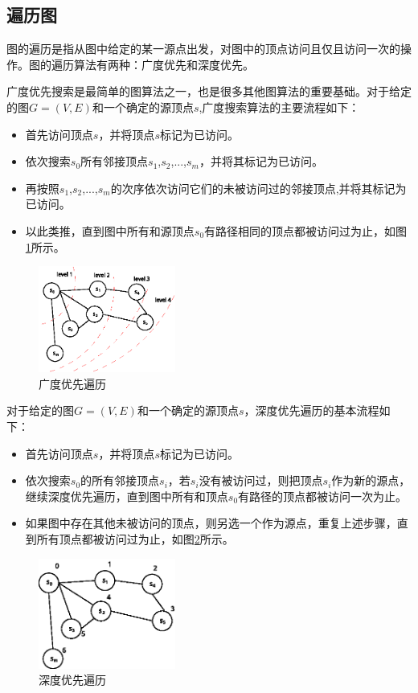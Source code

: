 \subsection{遍历图}
图的遍历是指从图中给定的某一源点出发，对图中的顶点访问且仅且访问一次的操作。图的遍历算法有两种：广度优先和深度优先。

广度优先搜索是最简单的图算法之一，也是很多其他图算法的重要基础。对于给定的图$G=(V,E)$和一个确定的源顶点$s$,广度搜索算法的主要流程如下：
\begin{itemize}
\item 首先访问顶点$s$，并将顶点$s$标记为已访问。
\item 依次搜索$s_0$所有邻接顶点$s_1$,$s_2$,...,$s_m$，并将其标记为已访问。
\item 再按照$s_1$,$s_2$,...,$s_m$的次序依次访问它们的未被访问过的邻接顶点,并将其标记为已访问。
\item 以此类推，直到图中所有和源顶点$s_0$有路径相同的顶点都被访问过为止，如图\ref{fig:graphbfs}所示。
\end{itemize}

\begin{figure}[htbp]
\centering
\includegraphics[width=0.4\textwidth]{myfigures/graphbfs}
\caption{广度优先遍历}\label{fig:graphbfs}
\vspace{\baselineskip}
\end{figure}

对于给定的图$G=(V,E)$和一个确定的源顶点$s$，深度优先遍历的基本流程如下：
\begin{itemize}
\item 首先访问顶点$s$，并将顶点$s$标记为已访问。
\item 依次搜索$s_0$的所有邻接顶点$s_i$，若$s_i$没有被访问过，则把顶点$s_i$作为新的源点，继续深度优先遍历，直到图中所有和顶点$s_0$有路径的顶点都被访问一次为止。
\item 如果图中存在其他未被访问的顶点，则另选一个作为源点，重复上述步骤，直到所有顶点都被访问过为止，如图\ref{fig:graphdfs}所示。
\end{itemize}

\begin{figure}[htbp]
\centering
\includegraphics[width=0.4\textwidth]{myfigures/graphdfs}
\caption{深度优先遍历}\label{fig:graphdfs}
\vspace{\baselineskip}
\end{figure}


